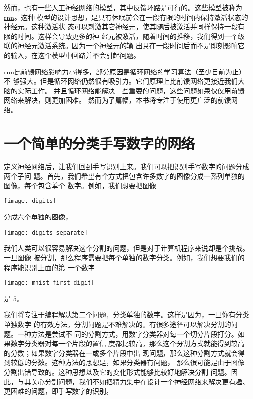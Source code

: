 然而，也有一些人工神经网络的模型，其中反馈环路是可行的。这些模型被称为%
\href{http://en.wikipedia.org/wiki/Recurrent_neural_network}{\gls{rnn}}。这种
模型的设计思想，是具有休眠前会在一段有限的时间内保持激活状态的神经元。这种激活状
态可以刺激其它神经元，使其随后被激活并同样保持一段有限的时间。这样会导致更多的神
经元被激活，随着时间的推移，我们得到一个级联的神经元激活系统。因为一个神经元的输
出只在一段时间后而不是即刻影响它的输入，在这个模型中回路并不会引起问题。

\gls*{rnn}比前馈网络影响力小得多，部分原因是循环网络的学习算法（至少目前为止）不
够强大。但是循环网络仍然很有吸引力。它们原理上比前馈网络更接近我们大脑的实际工作。
并且循环网络能解决一些重要的问题，这些问题如果仅仅用前馈网络来解决，则更加困难。
然而为了篇幅，本书将专注于使用更广泛的前馈网络。

\section{一个简单的分类手写数字的网络}

定义神经网络后，让我们回到手写识别上来。我们可以把识别手写数字的问题分成两个子问
题。首先，我们希望有个方式把包含许多数字的图像分成一系列单独的图像，每个包含单个
数字。例如，我们想要把图像
\begin{center}
  \texttt{[image: digits]}
\end{center}
分成六个单独的图像，
\begin{center}
  \texttt{[image: digits\_separate]}
\end{center}

我们人类可以很容易解决这个分割的问题，但是对于计算机程序来说却是个挑战。一旦图像
被分割，那么程序需要把每个单独的数字分类。例如，我们想要我们的程序能识别上面的第
一个数字
\begin{center}
  \texttt{[image: mnist\_first\_digit]}
\end{center}
是 $5$。

我们将专注于编程解决第二个问题，分类单独的数字。这样是因为，一旦你有分类单独数字
的有效方法，分割问题是不难解决的。有很多途径可以解决分割的问题。一种方法是尝试不
同的分割方式，用数字分类器对每一个切分片段打分。如果数字分类器对每一个片段的置信
度都比较高，那么这个分割方式就能得到较高的分数；如果数字分类器在一或多个片段中出
现问题，那么这种分割方式就会得到较低的分数。这种方法的思想是，如果分类器有问题，
那么很可能是由于图像分割出错导致的。这种思想以及它的变化形式能够比较好地解决分割
问题。因此，与其关心分割问题，我们不如把精力集中在设计一个神经网络来解决更有趣、
更困难的问题，即手写数字的识别。

